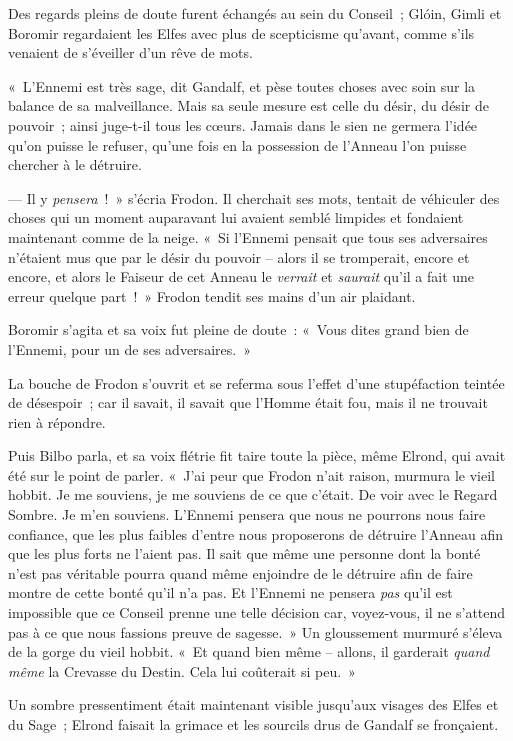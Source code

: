 Des regards pleins de doute furent échangés au sein du Conseil~; Glóin, Gimli et Boromir regardaient les Elfes avec plus de scepticisme qu'avant, comme s'ils venaient de s'éveiller d'un rêve de mots.

«~L'Ennemi est très sage, dit Gandalf, et pèse toutes choses avec soin sur la balance de sa malveillance. Mais sa seule mesure est celle du désir, du désir de pouvoir~; ainsi juge-t-il tous les cœurs. Jamais dans le sien ne germera l'idée qu'on puisse le refuser, qu'une fois en la possession de l'Anneau l'on puisse chercher à le détruire.

--- Il y \emph{pensera}~!~» s'écria Frodon. Il cherchait ses mots, tentait de véhiculer des choses qui un moment auparavant lui avaient semblé limpides et fondaient maintenant comme de la neige. «~Si l'Ennemi pensait que tous ses adversaires n'étaient mus que par le désir du pouvoir -- alors il se tromperait, encore et encore, et alors le Faiseur de cet Anneau le \emph{verrait} et \emph{saurait} qu'il a fait une erreur quelque part~!~» Frodon tendit ses mains d'un air plaidant.

Boromir s'agita et sa voix fut pleine de doute~: «~Vous dites grand bien de l'Ennemi, pour un de ses adversaires.~»

La bouche de Frodon s'ouvrit et se referma sous l'effet d'une stupéfaction teintée de désespoir~; car il savait, il savait que l'Homme était fou, mais il ne trouvait rien à répondre.

Puis Bilbo parla, et sa voix flétrie fit taire toute la pièce, même Elrond, qui avait été sur le point de parler. «~J'ai peur que Frodon n'ait raison, murmura le vieil hobbit. Je me souviens, je me souviens de ce que c'était. De voir avec le Regard Sombre. Je m'en souviens. L'Ennemi pensera que nous ne pourrons nous faire confiance, que les plus faibles d'entre nous proposerons de détruire l'Anneau afin que les plus forts ne l'aient pas. Il sait que même une personne dont la bonté n'est pas véritable pourra quand même enjoindre de le détruire afin de faire montre de cette bonté qu'il n'a pas. Et l'Ennemi ne pensera \emph{pas} qu'il est impossible que ce Conseil prenne une telle décision car, voyez-vous, il ne s'attend pas à ce que nous fassions preuve de sagesse.~» Un gloussement murmuré s'éleva de la gorge du vieil hobbit. «~Et quand bien même -- allons, il garderait \emph{quand même} la Crevasse du Destin. Cela lui coûterait si peu.~»

Un sombre pressentiment était maintenant visible jusqu'aux visages des Elfes et du Sage~; Elrond faisait la grimace et les sourcils drus de Gandalf se fronçaient.

